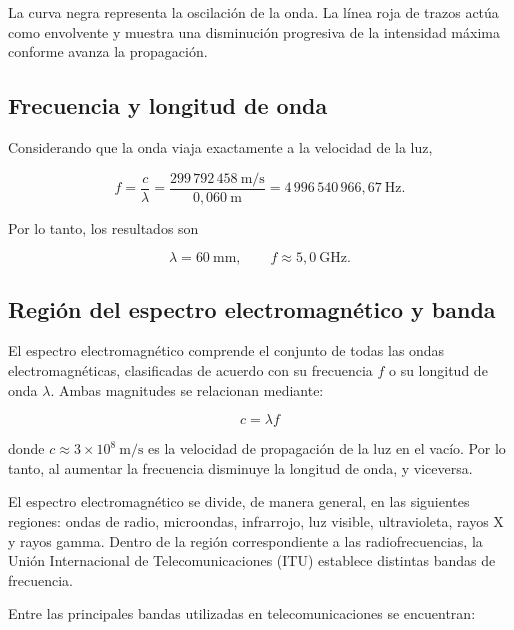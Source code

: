 ﻿\documentclass[12pt,a4paper]{article}
\begin{document}
La curva negra representa la oscilación de la onda. La línea roja de trazos
actúa como envolvente y muestra una disminución progresiva de la intensidad
máxima conforme avanza la propagación.

\subsection{Frecuencia y longitud de onda}

Considerando que la onda viaja exactamente a la velocidad de la luz,

\[
f=\frac{c}{\lambda}
=\frac{299\,792\,458\ \mathrm{m/s}}{0{,}060\ \mathrm{m}}
=4\,996\,540\,966{,}67\ \mathrm{Hz}.
\]

Por lo tanto, los resultados son

\[
\boxed{\lambda=60\ \mathrm{mm}},\qquad
\boxed{f\approx 5{,}0\ \mathrm{GHz}}.
\]

\subsection{Región del espectro electromagnético y banda}

El espectro electromagnético comprende el conjunto de todas las ondas
electromagnéticas, clasificadas de acuerdo con su frecuencia $f$ o su
longitud de onda $\lambda$. Ambas magnitudes se relacionan mediante:

\begin{equation}
    c = \lambda f
\end{equation}

donde $c \approx 3 \times 10^{8}\ \text{m/s}$ es la velocidad de propagación
de la luz en el vacío. Por lo tanto, al aumentar la frecuencia disminuye la
longitud de onda, y viceversa.

El espectro electromagnético se divide, de manera general, en las siguientes
regiones: ondas de radio, microondas, infrarrojo, luz visible, ultravioleta,
rayos X y rayos gamma. Dentro de la región correspondiente a las
radiofrecuencias, la Unión Internacional de Telecomunicaciones (ITU) establece
distintas bandas de frecuencia.

Entre las principales bandas utilizadas en telecomunicaciones se encuentran:
\end{document}
